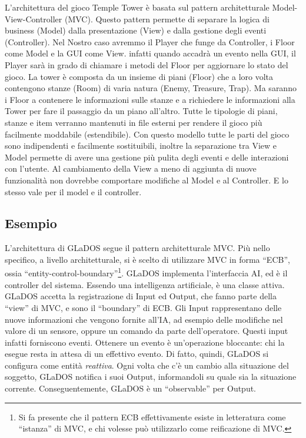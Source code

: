\documentclass[a4paper,12pt]{report}
\begin{document}
L'architettura del gioco Temple Tower è basata sul pattern architetturale Model-View-Controller (MVC). 
%
Questo pattern permette di separare la logica di business (Model) dalla presentazione (View) e dalla gestione degli eventi (Controller).
%
Nel Nostro caso avremmo il Player che funge da Controller, i Floor come Model e la GUI come View. 
%
infatti quando accadrà un evento nella GUI, il Player sarà in grado di chiamare i metodi del Floor per aggiornare lo stato del gioco.
%
La tower è composta da un insieme di piani (Floor) che a loro volta contengono stanze (Room) di varia natura (Enemy, Treasure, Trap).
%
Ma saranno i Floor a contenere le informazioni sulle stanze e a richiedere le informazioni alla Tower per fare il passaggio da un piano all'altro.
%
Tutte le tipologie di piani, stanze e item verranno mantenuti in file esterni per rendere il gioco più facilmente moddabile (estendibile).
%
Con questo modello tutte le parti del gioco sono indipendenti e facilmente sostituibili, inoltre la separazione tra View e Model permette di avere una gestione più pulita degli eventi e delle interazioni con l'utente.
%
Al cambiamento della View a meno di aggiunta di nuove funzionalità non dovrebbe comportare modifiche al Model e al Controller.
%
E lo stesso vale per il model e il controller.



\subsection*{Esempio}

L'architettura di GLaDOS segue il pattern architetturale MVC.
%
Più nello specifico, a livello architetturale, si è scelto di utilizzare MVC in forma ``ECB'', ossia ``entity-control-boundary''\footnote{
Si fa presente che il pattern ECB effettivamente esiste in letteratura come ``istanza'' di MVC, e chi volesse può utilizzarlo come reificazione di MVC.
}.
%
GLaDOS implementa l'interfaccia AI, ed è il controller del sistema.
Essendo una intelligenza artificiale, è una classe attiva.
%
GLaDOS accetta la registrazione di Input ed Output, che fanno parte della ``view'' di MVC, e sono il ``boundary'' di ECB.
Gli Input rappresentano delle nuove informazioni che vengono fornite all'IA, ad esempio delle modifiche nel valore di un sensore, oppure un comando da parte dell'operatore.
Questi input infatti forniscono eventi.
Ottenere un evento è un'operazione bloccante: chi la esegue resta in attesa di un effettivo evento.
Di fatto, quindi, GLaDOS si configura come entità \textit{reattiva}.
Ogni volta che c'è un cambio alla situazione del soggetto, GLaDOS notifica i suoi Output,
informandoli su quale sia la situazione corrente.
%
Conseguentemente, GLaDOS è un ``observable'' per Output.
\end{document}
